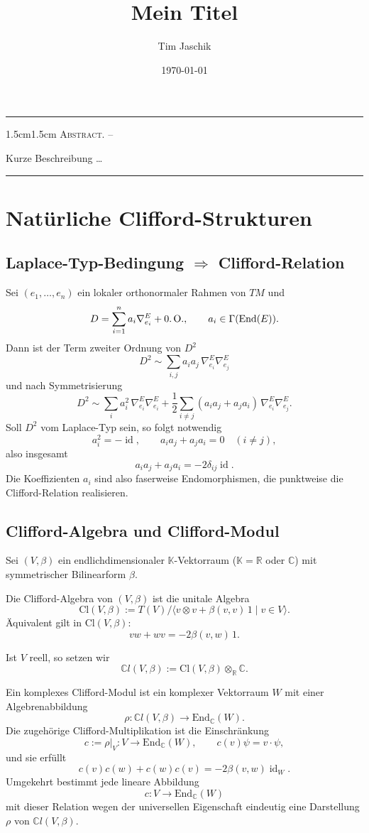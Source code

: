 \documentclass[10pt, letterpaper]{article}
\title{Mein Titel}
\author{Tim Jaschik}
\date{\today}
\newcommand{\id}{\operatorname{id}}
\newcommand{\K}{\mathbb{K}}
\newcommand{\R}{\mathbb{R}}
\newcommand{\C}{\mathbb{C}}
\newcommand{\End}{\mathrm{End}}
\newcommand{\Cl}{\mathrm{Cl}}
\renewenvironment{abstract}
  {
    \begin{adjustwidth}{1.5cm}{1.5cm}
    \small
    \textsc{Abstract. –}%
  }
  {
    \end{adjustwidth}
  }
\begin{document}
\maketitle
\rule{\textwidth}{0.5pt}
\begin{abstract}
Kurze Beschreibung …
\end{abstract}
\rule{\textwidth}{0.5pt}
\vspace{0.5cm}

\tableofcontents

\pagebreak

\section{Natürliche Clifford-Strukturen}

\subsection{Laplace-Typ-Bedingung $\Rightarrow$ Clifford-Relation}

Sei $(e_1,\dots,e_n)$ ein lokaler orthonormaler Rahmen von $TM$ und
\[
D=\sum_{i=1}^n a_i\nabla^E_{e_i}+\text{0.\,O.},
\qquad a_i\in \Gamma(\End(E)).
\]
Dann ist der Term zweiter Ordnung von $D^2$
\[
D^2\sim \sum_{i,j} a_i a_j\,\nabla^E_{e_i}\nabla^E_{e_j}
\]
und nach Symmetrisierung
\[
D^2\sim
\sum_i a_i^2\,\nabla^E_{e_i}\nabla^E_{e_i}
+\frac12\sum_{i\neq j}(a_i a_j+a_j a_i)\,\nabla^E_{e_i}\nabla^E_{e_j}.
\]
Soll $D^2$ vom Laplace-Typ sein, so folgt notwendig
\[
a_i^2=-\id,
\qquad
a_i a_j+a_j a_i=0 \quad (i\neq j),
\]
also insgesamt
\[
a_i a_j+a_j a_i=-2\delta_{ij}\id.
\]
Die Koeffizienten $a_i$ sind also faserweise Endomorphismen, die punktweise
die Clifford-Relation realisieren.



\subsection{Clifford-Algebra und Clifford-Modul}

Sei $(V,\beta)$ ein endlichdimensionaler $\K$-Vektorraum ($\K=\R$ oder $\C$)
mit symmetrischer Bilinearform $\beta$.

Die Clifford-Algebra von $(V,\beta)$ ist die unitale Algebra
\[
\Cl(V,\beta)
:=
T(V)\big/\big\langle v\otimes v+\beta(v,v)\,1 \;|\; v\in V\big\rangle.
\]
Äquivalent gilt in $\Cl(V,\beta)$:
\[
vw+w v=-2\beta(v,w)\,1.
\]

Ist $V$ reell, so setzen wir
\[
\C l(V,\beta):=\Cl(V,\beta)\otimes_\R \C.
\]

Ein komplexes Clifford-Modul ist ein komplexer Vektorraum $W$ mit einer
Algebrenabbildung
\[
\rho:\C l(V,\beta)\longrightarrow \End_\C(W).
\]
Die zugehörige Clifford-Multiplikation ist die Einschränkung
\[
c:=\rho|_V:V\to \End_\C(W),
\qquad c(v)\psi=v\cdot\psi,
\]
und sie erfüllt
\[
c(v)c(w)+c(w)c(v)=-2\beta(v,w)\id_W.
\]
Umgekehrt bestimmt jede lineare Abbildung
\[
c:V\to \End_\C(W)
\]
mit dieser Relation wegen der universellen Eigenschaft eindeutig eine Darstellung
$\rho$ von $\C l(V,\beta)$.

\pagebreak
\printbibliography
\end{document}
